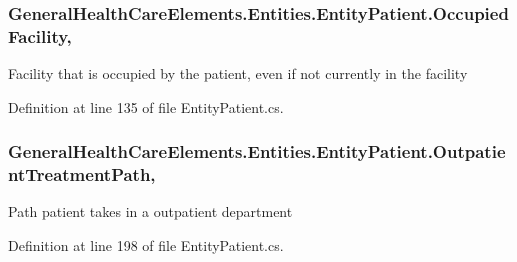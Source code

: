 \subsubsection[{\texorpdfstring{Occupied\+Facility}{OccupiedFacility}}]{ General\+Health\+Care\+Elements.\+Entities.\+Entity\+Patient.\+Occupied\+Facility\hspace{0.3cm}{\ttfamily [get]}, {\ttfamily [set]}}\hypertarget{class_general_health_care_elements_1_1_entities_1_1_entity_patient_af1ed1de9257c69d251cc055ec8604943}{}\label{class_general_health_care_elements_1_1_entities_1_1_entity_patient_af1ed1de9257c69d251cc055ec8604943}


Facility that is occupied by the patient, even if not currently in the facility 



Definition at line 135 of file Entity\+Patient.\+cs.

\subsubsection[{\texorpdfstring{Outpatient\+Treatment\+Path}{OutpatientTreatmentPath}}]{ General\+Health\+Care\+Elements.\+Entities.\+Entity\+Patient.\+Outpatient\+Treatment\+Path\hspace{0.3cm}{\ttfamily [get]}, {\ttfamily [set]}}\hypertarget{class_general_health_care_elements_1_1_entities_1_1_entity_patient_a27ee6bd52e0308e6a37aa900538e82aa}{}\label{class_general_health_care_elements_1_1_entities_1_1_entity_patient_a27ee6bd52e0308e6a37aa900538e82aa}


Path patient takes in a outpatient department 



Definition at line 198 of file Entity\+Patient.\+cs.

